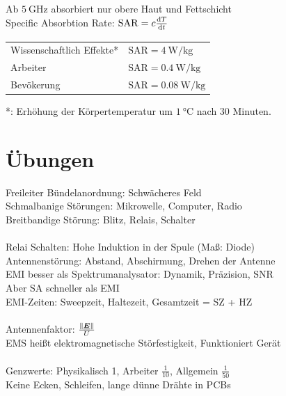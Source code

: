 \documentclass[fs, footer]{latex4ei}
\begin{document}
\begin{multicols*}{4}
{	Ab $\SI{5}{\giga \hertz}$ absorbiert nur obere Haut und Fettschicht\\
	Specific Absorbtion Rate: $\mathrm{SAR} = c \frac{\diff T}{\diff t}$\\

	\begin{tabular}{ll}
		Wissenschaftlich Effekte* & $\mathrm{SAR} = \SI{4}{\watt \per \kilogram}$\\
		Arbeiter & $\mathrm{SAR} = \SI{0.4}{\watt \per \kilogram}$\\
		Bevökerung & $\mathrm{SAR} = \SI{0.08}{\watt \per \kilogram}$\\
	\end{tabular}

	*: Erhöhung der Körpertemperatur um $\SI{1}{\celsius}$ nach 30 Minuten.\\
}


\section{Übungen}
Freileiter Bündelanordnung: Schwächeres Feld\\
Schmalbanige Störungen: Mikrowelle, Computer, Radio\\
Breitbandige Störung: Blitz, Relais, Schalter\\
\\
Relai Schalten: Hohe Induktion in der Spule (Maß: Diode)\\
Antennenstörung: Abstand, Abschirmung, Drehen der Antenne\\
EMI besser als Spektrumanalysator: Dynamik, Präzision, SNR\\
Aber SA schneller als EMI\\
EMI-Zeiten: Sweepzeit, Haltezeit, Gesamtzeit = SZ + HZ\\
\\
Antennenfaktor: $\frac{\left\|\underline{\boldsymbol {E}}\right\|}{U}$\\
EMS heißt elektromagnetische Störfestigkeit, Funktioniert Gerät\\
\\
Genzwerte: Physikalisch 1, Arbeiter $\frac{1}{10}$, Allgemein $\frac{1}{50}$\\
Keine Ecken, Schleifen, lange dünne Drähte in PCBs




\end{multicols*}
\end{document}
